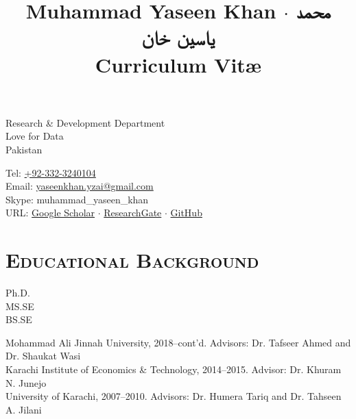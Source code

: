 \documentclass[a4paper, 10pt]{article}
\title{{\huge Muhammad Yaseen Khan}
 $\cdot$ {\huge\texturdu{محمد یاسین خان}}
\\\small Curriculum Vit\ae}
\author{}
\date{}
\begin{document}
\maketitle
\vspace{-3em}
\begin{minipage}{0.45\textwidth}
Research \& Development Department\\
Love for Data\\
Pakistan\\
\hfill
\end{minipage}
\hfill
\begin{minipage}{0.45\textwidth}
Tel: \href{tel:+923323240104}{+92-332-3240104}\\
Email: \href{mailto:yaseenkhan.yzai@gmail.com}{yaseenkhan.yzai@gmail.com}\\
Skype: muhammad\_yaseen\_khan\\
URL: \href{https://scholar.google.com/citations?user=a_d2KTEAAAAJ&hl=en}{Google Scholar} $\cdot$ \href{https://www.researchgate.net/profile/Muhammad_Yaseen_Khan}{ResearchGate} $\cdot$ \href{https://www.github.com/MuhammadYaseenKhan}{GitHub}
\end{minipage}


\section*{\normalfont\textsc{Educational Background}}
\hfill\begin{minipage}{0.085\textwidth}
Ph.D.\\
MS.SE\\
BS.SE
\end{minipage}%
\begin{minipage}{0.95\textwidth}
Mohammad Ali Jinnah University, 2018--cont'd. 
Advisors: Dr. Tafseer Ahmed and Dr. Shaukat Wasi\\
Karachi Institute of Economics \& Technology, 2014--2015. Advisor: Dr. Khuram N. Junejo\\
University of Karachi, 2007--2010. Advisors: Dr. Humera Tariq and Dr. Tahseen A. Jilani
\end{minipage}


\end{document}
